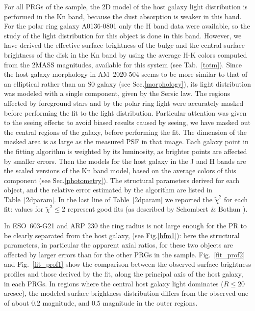 \documentclass{aa}
\begin{document}
For all PRGs of the sample, the 2D model of the host galaxy light distribution
 is performed in the Kn band, because the dust absorption is weaker in this
band. For the polar ring galaxy A0136-0801 only the H band data were available,
so the study of the light distribution for this object is done in this 
band. However, we have derived the effective surface brightness of the 
bulge and the central surface brightness of the disk in the Kn band by
using the average H-K colors computed from the 2MASS magnitudes, available 
for this system (see Tab.~\ref{totm}). 
Since the host galaxy morphology in AM~2020-504 seems to be more similar to 
that of an elliptical rather than an S0 galaxy (see Sec.\ref{morphology}), 
its light distribution was modeled with a single component, given by the 
Sersic law.  
The regions affected by foreground stars and by the polar ring light
were accurately masked before performing the fit to the light distribution.
Particular attention was given to the seeing effects: to avoid biased
results  caused by seeing, we have masked out the central regions of the
galaxy, before 
performing the fit. The dimension of the masked area is as large
as the measured PSF in that image.
Each galaxy point in the fitting algorithm is weighted by its luminosity,
as brighter points are affected by smaller errors. 
Then the models for the host galaxy in the J and H bands are
the scaled versions of the Kn band model, based on the average colors of 
this component (see Sec.\ref{photometry}).
The structural parameters derived for each object, and the relative 
error estimated by the algorithm are listed in Table~\ref{2dparam}. 
In the last line of Table~\ref{2dparam} we reported the $\tilde{\chi} ^2$ 
for each fit: values for $\tilde{\chi} ^2 \le 2$ represent good fits 
(as described by Schombert \& Bothun \cite{schombert87}).

In ESO~603-G21 and ARP 230 the ring radius is not large enough for the PR
to be clearly separated from the host galaxy, (see Fig.\ref{hfm1}): 
here the structural parameters, in particular the apparent 
axial ratios, for these two objects are affected by larger 
errors than for the other PRGs in the sample. 
Fig.~\ref{fit_prof2} and Fig.~\ref{fit_prof1} show the comparison between the 
observed surface brightness profiles and those derived by the fit, 
along the principal axis of the host galaxy, in each PRGs. 
In regions where the central host galaxy light dominates ($R \le 20$ arcsec), 
the modeled surface brightness distribution differs from
the observed one of about $0.2$ magnitude, and $0.5$ 
magnitude in the outer regions.
\end{document}
